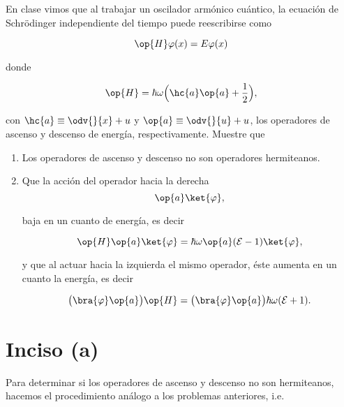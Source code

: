 \documentclass[../main.tex]{subfiles}
\begin{document}
\begin{problema}[30]
	En clase vimos que al trabajar un oscilador armónico cuántico, la ecuación de
	Schrödinger independiente del tiempo puede reescribirse como

	\begin{equation*}
		\op{H}\varphi(x) = E\varphi(x)
	\end{equation*}

	donde

	\begin{equation*}
		\op{H} = \hbar\omega \Bigl(\hc{a}\op{a} + \dfrac{1}{2}\Bigr),
	\end{equation*}

	con \(\hc{a} \equiv \odv{}{x} + u\) y \( \op{a} \equiv \odv{}{u} + u\), los
	operadores de ascenso y descenso de energía, respectivamente. Muestre que

	\begin{enumerate}
		\item Los operadores de ascenso y descenso no son operadores hermiteanos.
		\item Que la acción del operador hacia la derecha
		      \begin{equation*}
			      \op{a} \ket{\varphi},
		      \end{equation*}

		      baja en un cuanto de energía, es decir

		      \begin{equation}
			      \op{H}\op{a}\ket{\varphi} = \hbar\omega\op{a}(\mathcal{E} - 1)\ket{\varphi},
			      \label{eq:annihilation-right}
		      \end{equation}

		      y que al actuar hacia la izquierda el mismo operador, éste aumenta en un
		      cuanto la energía, es decir

		      \begin{equation}
			      \bigl(\bra{\varphi}\op{a}\bigr)\op{H} = \bigl(\bra{\varphi}\op{a}\bigr)\hbar\omega(\mathcal{E} + 1).
			      \label{eq:annihilation-left}
		      \end{equation}
	\end{enumerate}

	\startsolution

	\section{Inciso (a)}

	Para determinar si los operadores de ascenso y descenso no son hermiteanos,
	hacemos el procedimiento análogo a los problemas anteriores, i.e.


\end{problema}
\end{document}
